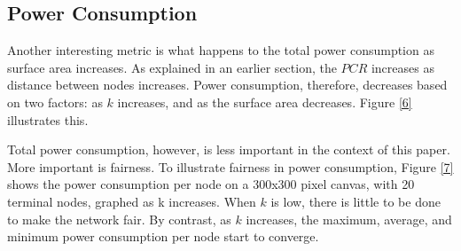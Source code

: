 \subsection{Power Consumption}

Another interesting metric is what happens to the total power consumption as surface area increases.  As explained in an earlier section, the $PCR$ increases as distance between nodes increases.  Power consumption, therefore, decreases based on two factors: as $k$ increases, and as the surface area decreases.  Figure \ref{6} illustrates this. 

Total power consumption, however, is less important in the context of this paper.  More important is fairness.  To illustrate fairness in power consumption, Figure \ref{7} shows the power consumption per node on a 300x300 pixel canvas, with 20 terminal nodes, graphed as k increases.  When $k$ is low, there is little to be done to make the network fair.  By contrast, as $k$ increases, the maximum, average, and minimum power consumption per node start to converge. 

